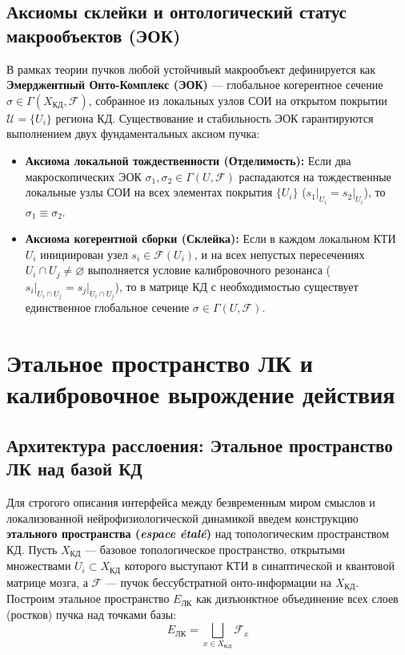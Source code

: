 \documentclass[12pt,a4paper]{article}
\begin{document}
\subsection{Аксиомы склейки и онтологический статус макрообъектов (ЭОК)}
В рамках теории пучков любой устойчивый макрообъект дефинируется как \textbf{Эмерджентный Онто-Комплекс (ЭОК)} --- глобальное когерентное сечение $\sigma \in \Gamma(X_{\text{КД}}, \mathcal{F})$, собранное из локальных узлов СОИ на открытом покрытии $\mathcal{U} = \{U_i\}$ региона КД. Существование и стабильность ЭОК гарантируются выполнением двух фундаментальных аксиом пучка:
\begin{itemize}
    \item \textbf{Аксиома локальной тождественности (Отделимость):} Если два макроскопических ЭОК $\sigma_1, \sigma_2 \in \Gamma(U, \mathcal{F})$ распадаются на тождественные локальные узлы СОИ на всех элементах покрытия $\{U_i\}$ ($s_{1}\vert_{U_i} = s_{2}\vert_{U_i}$), то $\sigma_1 \equiv \sigma_2$.
    \item \textbf{Аксиома когерентной сборки (Склейка):} Если в каждом локальном КТИ $U_i$ инициирован узел $s_i \in \mathcal{F}(U_i)$, и на всех непустых пересечениях $U_i \cap U_j \neq \varnothing$ выполняется условие калибровочного резонанса ($s_i\vert_{U_i \cap U_j} = s_j\vert_{U_i \cap U_j}$), то в матрице КД с необходимостью существует единственное глобальное сечение $\sigma \in \Gamma(U, \mathcal{F})$.
\end{itemize}

\section{Этальное пространство ЛК и калибровочное вырождение действия}

\subsection{Архитектура расслоения: Этальное пространство ЛК над базой КД}
Для строгого описания интерфейса между безвременным миром смыслов и локализованной нейрофизиологической динамикой введем конструкцию \textbf{этального пространства (\textit{espace étalé})} над топологическим пространством КД. Пусть $X_{\text{КД}}$ --- базовое топологическое пространство, открытыми множествами $U_i \subset X_{\text{КД}}$ которого выступают КТИ в синаптической и квантовой матрице мозга, а $\mathcal{F}$ --- пучок бессубстратной онто-информации на $X_{\text{КД}}$. Построим этальное пространство $E_{\text{ЛК}}$ как дизъюнктное объединение всех слоев (ростков) пучка над точками базы:
\begin{equation}
E_{\text{ЛК}} = \bigsqcup_{x \in X_{\text{КД}}} \mathcal{F}_x
\end{equation}
\end{document}
